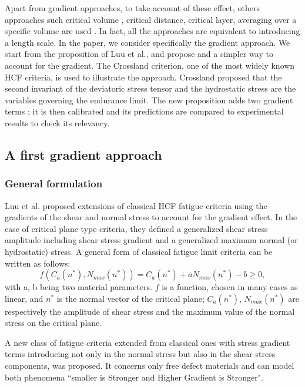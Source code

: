 \documentclass[3p,times,procedia,number]{elsarticle}
\begin{document}
Apart from gradient approaches\cite{Amargier20101904}\cite{Papadopoulos1996513}, to take account of these effect, others approaches such critical volume \cite{maitournam2009fatigue}, critical distance\cite{taylor2010theory}\cite{Araujo200795}, critical layer\cite{flavenot1983epaisseur}, averaging over a specific volume \cite{palin2000stress}\cite{Banvillet2003755} are used . In fact, all the approaches are equivalent to introducing a length scale. 
In the paper, we consider specifically the gradient approach. We start from the proposition of Luu et al., and propose and a simpler way to account for the gradient. The Crossland criterion, one of the most widely known HCF criteria, is used to illustrate the approach. Crossland proposed that the second invariant of the deviatoric stress tensor and the hydrostatic stress are the variables governing the endurance limit. 
The new proposition adds two gradient terms ; it is then calibrated and its predictions are compared to experimental results to check its relevancy.


\subsection{A first gradient approach \cite{luu2013formulation}}
\subsubsection{General formulation}

Luu et al. \cite{luu2013formulation} proposed extensions of classical HCF fatigue criteria using the gradients of the shear and normal stress to account for the gradient effect. In the case of critical plane type criteria, they defined a generalized shear stress amplitude including shear stress gradient and a generalized maximum normal (or hydrostatic) stress.
A general form of classical fatigue limit criteria can be written as follows:
\begin{equation}
\label{eq:classical}
f(C_a(n^*),N_{max}(n^*))=C_a(n^*)+aN_{max}(n^*)-b\geqslant 0 ,
\end{equation}
with a, b being two material parameters. $f$ is a function, chosen in many cases as linear, and $n^*$ is the normal vector of the critical plane; $C_a(n^* )$, $N_{max} (n^* )$ are respectively the amplitude of shear stress and the maximum value of the normal stress on the critical plane.

A new class of fatigue criteria extended from classical ones with stress gradient terms introducing not only in the normal stress but also in the shear stress components, was proposed. It concerns only free defect materials and can model both phenomena ``smaller is Stronger and Higher Gradient is Stronger". 
\end{document}
